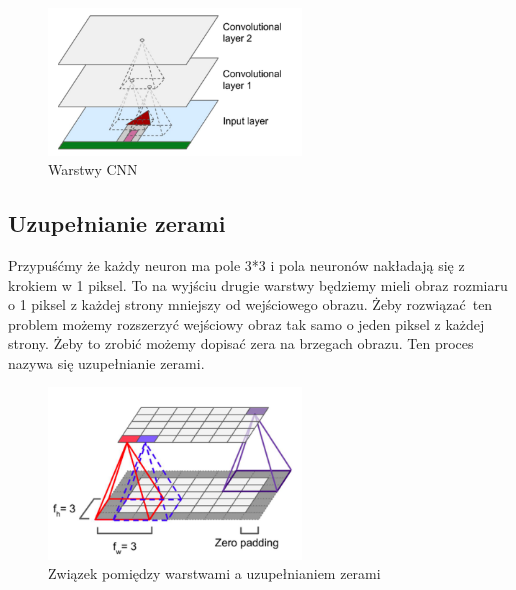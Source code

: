 \documentclass{article}
\begin{document}
\begin{figure}[H]
	\centering
	\includegraphics[width=0.6\textwidth,keepaspectratio=true]{warstwa_splotowa}
	\caption{Warstwy CNN \cite{geron}}
	\label{warstwa_splotowa}
\end{figure}

\subsection{Uzupełnianie zerami}
Przypuśćmy że każdy neuron ma pole 3*3 i pola neuronów nakładają się z krokiem w 1 piksel. To na wyjściu drugie warstwy będziemy mieli obraz rozmiaru o 1 piksel z każdej strony mniejszy od wejściowego obrazu. Żeby rozwiązać ten problem możemy rozszerzyć wejściowy obraz tak samo o jeden piksel z każdej strony. Żeby to zrobić możemy dopisać zera na brzegach obrazu. Ten proces nazywa się uzupełnianie zerami.
\begin{figure}[H]
	\centering
	\includegraphics[width=0.6\textwidth,keepaspectratio=true]{padding}
	\caption{Związek pomiędzy warstwami a uzupełnianiem zerami \cite{geron}}
	\label{padding}
\end{figure}

\end{document}
